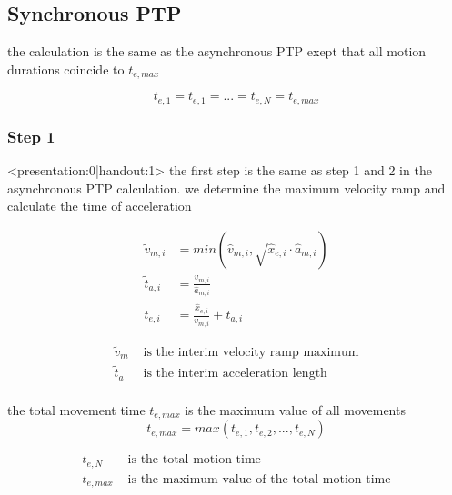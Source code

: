 \documentclass[%
  professionalfonts,%
  xcolor={%
    usenames,%
    dvipsnames,%
    svgnames,%
    table,%
    hyperref%
  }%
]{beamer}
\begin{document}
\subsection{Synchronous PTP}
\begin{frame}
the calculation is the same as the asynchronous PTP
exept that all motion durations coincide to $t_{e,max}$

\begin{equation*}
t_{e,1} = t_{e,1} = ... = t_{e,N} = t_{e,max}
\end{equation*}
\end{frame}

\subsubsection{Step 1}
\begin{frame}<presentation:0|handout:1>
the first step is the same as step 1 and 2 in the asynchronous PTP calculation. we determine the maximum velocity ramp and  calculate the time of acceleration
\end{frame}

\begin{frame}
\begin{align*}
\tilde{v}_{m,i} & = min(\hat{v}_{m,i},\sqrt{\hat{x}_{e,i} \cdot \hat{a}_{m,i}}) \\
\tilde{t}_{a,i} & = \frac{v_{m,i}}{\hat{a}_{m,i}}\\
t_{e,i} & = \frac{\hat{x}_{e,i}}{v_{m,i}} + t_{a,i}
\end{align*}

\begin{align*}
\tilde{v}_{m} & \text{ is the interim velocity ramp maximum}\\
\tilde{t}_{a} & \text{ is the interim acceleration length}\\
\end{align*}                 
\end{frame}

\begin{frame}
the total movement time $t_{e,max}$ is the maximum value of all movements
\begin{equation}
t_{e,max} = max(t_{e,1},t_{e,2},...,t_{e,N})
\end{equation}

\begin{align*}
t_{e,N} & \text{ is the total motion time } \\
t_{e,max} & \text{ is the maximum value of the total motion time}      
\end{align*}
\end{frame}
  
\end{document}
